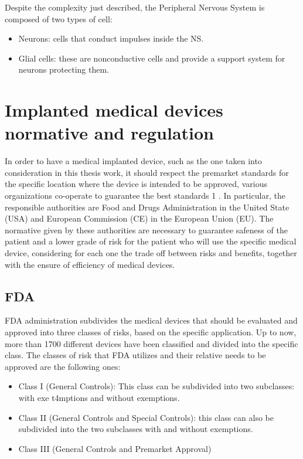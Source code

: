\documentclass{Configuration_Files/PoliMi3i_thesis}
\begin{document}
Despite the complexity just described, the Peripheral Nervous System is composed of two types of cell:

\begin{itemize}

	\item  Neurons: cells that conduct impulses inside the NS.
	\item Glial cells: these are nonconductive cells and provide a support system for
	neurons protecting them.
\end{itemize}



\section{Implanted medical devices normative and regulation}

In order to have a medical implanted device, such as the one taken into consideration in this thesis work, it should respect the premarket standards for the specific location where the device is intended to be approved, various organizations co-operate to guarantee the best standards \cite{} 1 . In particular, the responsible authorities are Food and Drugs Administration in the United State (USA) and European Commission (CE) in the European Union (EU). 
The normative given by these authorities are necessary to guarantee safeness of the patient and a lower grade of risk for the patient who will use the specific medical device, considering for each one the trade off between risks and benefits, together with the ensure of efficiency of medical devices.

\subsection{FDA}

FDA administration subdivides the medical devices that should be evaluated and approved into three classes of risks, based on the specific application. Up to now, more than 1700 different devices have been classified and divided into the specific class. \cite{healthClassifyYourMedical2023}
The classes of risk that FDA utilizes and their relative needs to be approved are the following ones: 
\begin{itemize}

	\item  Class I (General Controls): This class can be subdivided into two subclasses: with exe        t4mptions and without exemptions.
	\item  Class II (General Controls and Special Controls): this class can also be subdivided into the two subclasses with and without exemptions.
	\item  Class III (General Controls and Premarket Approval)

\end{itemize}
\end{document}
